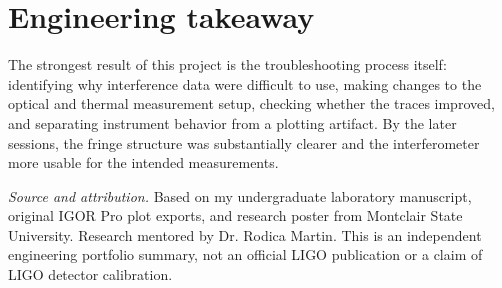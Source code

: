\documentclass[10pt,a4paper]{extarticle}
\begin{document}
\section{Engineering takeaway}
The strongest result of this project is the troubleshooting process itself: identifying why interference data were difficult to use, making changes to the optical and thermal measurement setup, checking whether the traces improved, and separating instrument behavior from a plotting artifact. By the later sessions, the fringe structure was substantially clearer and the interferometer more usable for the intended measurements.

\vspace{3pt}
{\footnotesize\color{muted}\textit{Source and attribution.} Based on my undergraduate laboratory manuscript, original IGOR Pro plot exports, and research poster from Montclair State University. Research mentored by Dr. Rodica Martin. This is an independent engineering portfolio summary, not an official LIGO publication or a claim of LIGO detector calibration.}
\end{document}
